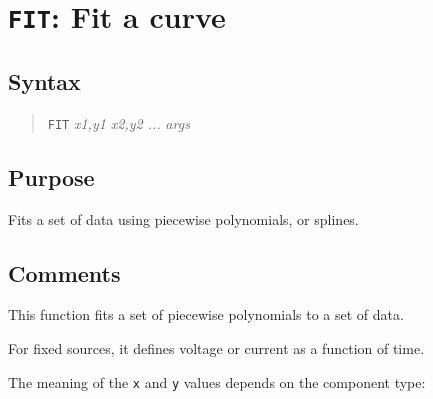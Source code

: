 %
%
%
%
\section{{\tt FIT}: Fit a curve}
\subsection{Syntax}
\begin{verse}
{\tt FIT} {\it x1,y1 x2,y2 ...} {\it args}
\end{verse}
\subsection{Purpose}

Fits a set of data using piecewise polynomials, or splines.
\subsection{Comments}

This function fits a set of piecewise polynomials to a set of data.

For fixed sources, it defines voltage or current as a function of
time.

The meaning of the {\tt x} and {\tt y} values depends on the component type:

